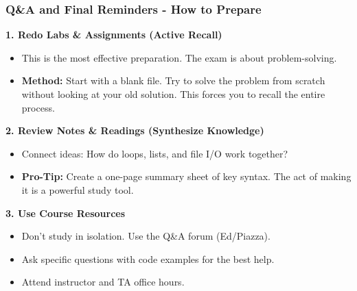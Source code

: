 \documentclass{beamer}
\begin{document}
\begin{frame}[fragile]
    \frametitle{Q\&A and Final Reminders - How to Prepare}
    \textbf{1. Redo Labs \& Assignments (Active Recall)}
    \begin{itemize}
        \item This is the most effective preparation. The exam is about problem-solving.
        \item \textbf{Method:} Start with a blank file. Try to solve the problem from scratch without looking at your old solution. This forces you to recall the entire process.
    \end{itemize}
    \vspace{1em}
    \textbf{2. Review Notes \& Readings (Synthesize Knowledge)}
    \begin{itemize}
        \item Connect ideas: How do loops, lists, and file I/O work together?
        \item \textbf{Pro-Tip:} Create a one-page summary sheet of key syntax. The act of making it is a powerful study tool.
    \end{itemize}
    \vspace{1em}
    \textbf{3. Use Course Resources}
    \begin{itemize}
        \item Don't study in isolation. Use the Q\&A forum (Ed/Piazza).
        \item Ask specific questions with code examples for the best help.
        \item Attend instructor and TA office hours.
    \end{itemize}
\end{frame}
\end{document}
